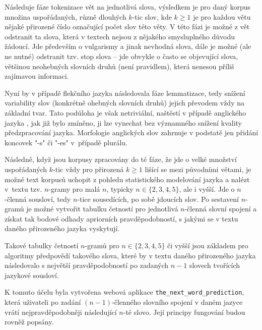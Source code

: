 Následuje fáze tokenizace vět na jednotlivá slova,
výsledkem je pro daný korpus množina uspořádaných, různě dlouhých
$k$-tic slov, kde $k \geq 1$ je pro každou větu nějaké přirozené číslo
označující počet slov této věty. V této fázi je možné z vět odstranit ta
slova, která v textech nejsou z nějakého smysluplného důvodu žádoucí.
Jde především o vulgarismy a jinak nevhodná
slova, dále je
možné (ale ne nutné) odstranit tzv. stop slova
-- jde obvykle o často
se objevující slova, většinou neohebných slovních druhů (není pravidlem),
která nenesou příliš zajímavou informaci.

Nyní by v případě flekčního jazyka následovala fáze
lemmatizace, tedy snížení
variability slov (konkrétně ohebných slovních druhů) jejich převodem vždy na základní
tvar. Tato podúloha je však netriviální, naštěstí v případě anglického jazyka%
,
jak již bylo zmíněno, ji lze vynechat bez významného snížení kvality
předzpracování jazyka. Morfologie anglických slov zahrnuje
v podstatě jen
přidání koncovek "-s" či "-es" v~případě plurálu.

Následně, když jsou korpusy zpracovány do té fáze, že jde o velké
množství uspořádaných $k$-tic vždy pro přirozená $k \geq 1$ lišící se
mezi původními větami, je možné text korpusů uchopit z pohledu
statistického modelování jazyka a nalézt v~textu tzv. $n$-gramy
pro malá
$n$, typicky $n \in \{2, 3, 4, 5\}$, ale i vyšší.
Jde o $n$-členná sousloví, tedy $n$-tice sousedících, po sobě
jdoucích slov\cite{Manning1999}. Po sestavení $n$-gramů je možné vytvořit
tabulku četností pro jednotlivá $n$-členná slovní spojení a získat tak bodové
odhady apriorních pravděpodobností, s jakými se v textu daného
přirozeného jazyka vyskytují.

Takové tabulky četností
$n$-gramů pro $n \in \{2, 3, 4, 5\}$ či vyšší
jsou základem pro algoritmy předpovědí takového slova, které by v textu
daného přirozeného jazyka následovalo s největší pravděpodobností po
zadaných $n - 1$ slovech tvořících jazykové sousloví.

K tomuto účelu byla vytvořena webová aplikace
\texttt{the\_next\_word\_prediction},
která uživateli po zadání
$(n - 1)$-členného slovního spojení v daném jazyce vrátí
nejpravděpodobněji následující $n$-té slovo. Její
principy fungování budou rovněž popsány.


\newpage







